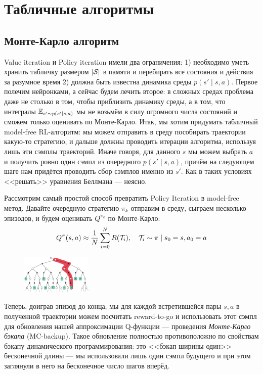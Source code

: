 \section{Табличные алгоритмы}\label{sec:tabularrlsection}

\subsection{Монте-Карло алгоритм}

Value iteration и Policy iteration имели два ограничения: 1) необходимо уметь хранить табличку размером $| \mathcal{S} |$ в памяти и перебирать все состояния и действия за разумное время 2) должна быть известна динамика среды $p(s' \mid s, a)$. Первое полечим нейронками, а сейчас будем лечить второе: в сложных средах проблема даже не столько в том, чтобы приблизить динамику среды, а в том, что интегралы $\mathbb{E}_{s' \sim p(s' \mid s, a)}$ мы не возьмём в силу огромного числа состояний и сможем только оценивать по Монте-Карло. 
Итак, мы хотим придумать табличный model-free RL-алгоритм: мы можем отправить в среду пособирать траектории какую-то стратегию, и дальше должны проводить итерации алгоритма, используя лишь эти сэмплы траекторий. Иначе говоря, для данного $s$ мы можем выбрать $a$ и получить ровно один сэмпл из очередного $p(s' \mid s, a)$, причём на следующем шаге нам придётся проводить сбор сэмплов именно из $s'$. Как в таких условиях <<решать>> уравнения Беллмана --- неясно.

Рассмотрим самый простой способ превратить Policy Iteration в model-free метод. Давайте очередную стратегию $\pi_k$ отправим в среду, сыграем несколько эпизодов, и будем оценивать $Q^{\pi_k}$ по Монте-Карло:
$$Q^{\pi}(s, a) \approx \frac{1}{N} \sum_{i=0}^N R(\mathcal{T}_i), \quad \mathcal{T}_i \sim \pi \mid s_0 = s, a_0 = a$$

\begin{figure}
\vspace{-0.3cm}
\centering
\includegraphics[width=0.3\textwidth]{Images/MC_backup.png}
\vspace{-0.3cm}
\end{figure}
Теперь, доиграв эпизод до конца, мы для каждой встретившейся пары $s, a$ в полученной траектории можем посчитать reward-to-go и использовать этот сэмпл для обновления нашей аппроксимации Q-функции --- проведения \emph{Монте-Карло бэкапа} (MC-backup). Такое обновление полностью противоположно по свойствам бэкапу динамического программирования: это <<бэкап ширины один>> бесконечной длины --- мы использовали лишь один сэмпл будущего и при этом заглянули в него на бесконечное число шагов вперёд.

